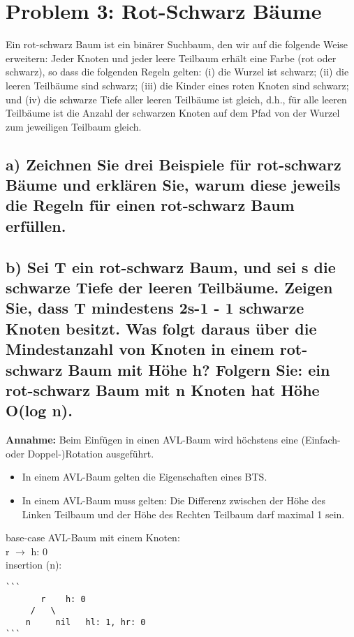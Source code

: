 \section*{{Problem 3: Rot-Schwarz Bäume}} 

Ein rot-schwarz Baum ist ein binärer Suchbaum, den wir auf die folgende Weise erweitern: Jeder Knoten und jeder leere Teilbaum erhält eine Farbe (rot oder schwarz), so dass die folgenden Regeln gelten: (i) die Wurzel ist schwarz; (ii) die leeren Teilbäume sind schwarz; (iii) die Kinder eines roten Knoten sind schwarz; und (iv) die schwarze Tiefe aller leeren Teilbäume ist gleich, d.h., für alle leeren Teilbäume ist die Anzahl der schwarzen Knoten auf dem Pfad von der Wurzel zum jeweiligen Teilbaum gleich.

\subsection*{a) Zeichnen Sie drei Beispiele für rot-schwarz Bäume und erklären Sie, warum diese jeweils die Regeln für einen rot-schwarz Baum erfüllen.}


\subsection*{b) Sei T ein rot-schwarz Baum, und sei s die schwarze Tiefe der leeren Teilbäume. Zeigen Sie, dass T mindestens 2s-1 - 1 schwarze Knoten besitzt. Was folgt daraus über die Mindestanzahl von Knoten in einem rot-schwarz Baum mit Höhe h? Folgern Sie: ein rot-schwarz Baum mit n Knoten hat Höhe O(log n).} 

\textbf{Annahme:} Beim Einfügen in einen AVL-Baum wird höchstens eine (Einfach- oder Doppel-)Rotation ausgeführt.
\begin{itemize}
	\item In einem AVL-Baum gelten die Eigenschaften eines BTS.
	\item In einem AVL-Baum muss gelten: Die Differenz zwischen der Höhe des Linken Teilbaum und der Höhe des Rechten Teilbaum darf maximal 1 sein.
\end{itemize}

\noindent
base-case AVL-Baum mit einem Knoten: \\
r $\rightarrow$ h: 0 \\

\noindent
insertion (n):
\begin{verbatim}
```
       r 	h: 0
     /   \
    n     nil 	hl: 1, hr: 0
```
\end{verbatim}

